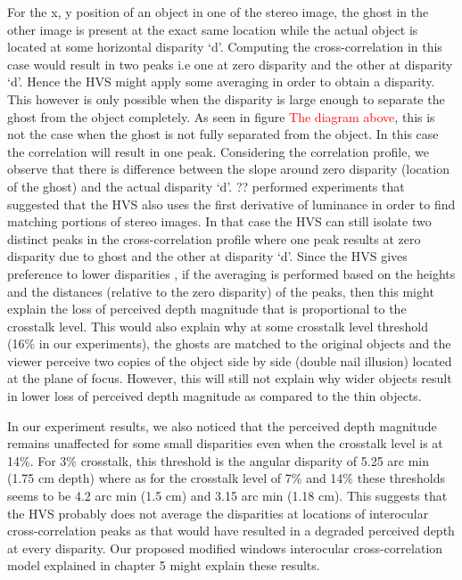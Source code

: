 For the x, y position of an object in one of the stereo image, the ghost in the other image is present at the exact same location while the actual object is located at some horizontal disparity `d'. Computing the cross-correlation in this case would result in two peaks i.e one at zero disparity and the other at disparity `d'. Hence the HVS might apply some averaging in order to obtain a disparity. This however is only possible when the disparity is large enough to separate the ghost from the object completely. As seen in figure \textcolor{red}{The diagram above}, this is not the case when the ghost is not fully separated from the object. In this case the correlation will result in one peak. Considering the correlation profile, we observe that there is difference between the slope around zero disparity (location of the ghost) and the actual disparity `d'. ?? performed experiments that suggested that the HVS also uses the first derivative of luminance in order to find matching portions of stereo images. In that case the HVS can still isolate two distinct peaks in the cross-correlation profile where one peak results at zero disparity due to ghost and the other at disparity `d'. Since the HVS gives preference to lower disparities \cite{krol1980double}, if the averaging is performed based on the heights and the distances (relative to the zero disparity) of the peaks, then this might explain the loss of perceived depth magnitude that is proportional to the crosstalk level. This would also explain why at some crosstalk level threshold (16\% in our experiments), the ghosts are matched to the original objects and the viewer perceive two copies of the object side by side (double nail illusion) located at the plane of focus. However, this will still not explain why wider objects result in lower loss of perceived depth magnitude as compared to the thin objects.

In our experiment results, we also noticed that the perceived depth magnitude remains unaffected for some small disparities even when the crosstalk level is at 14\%. For 3\% crosstalk, this threshold is the angular disparity of 5.25 arc min (1.75 cm depth) where as for the crosstalk level of 7\% and 14\% these thresholds seems to be 4.2 arc min (1.5 cm) and 3.15 arc min (1.18 cm). This suggests that the HVS probably does not average the disparities at locations of interocular cross-correlation peaks as that would have resulted in a degraded perceived depth at every disparity. Our proposed modified windows interocular cross-correlation model explained in chapter 5 might explain these results.


